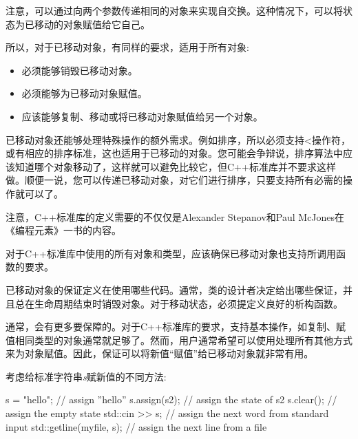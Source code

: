 
注意，可以通过向两个参数传递相同的对象来实现自交换。这种情况下，可以将状态为已移动的对象赋值给它自己。\par

所以，对于已移动对象，有同样的要求，适用于所有对象:\par

\begin{itemize}
  \item 必须能够销毁已移动对象。
  \item 必须能够为已移动对象赋值。
  \item 应该能够复制、移动或将已移动对象赋值给另一个对象。
\end{itemize}

已移动对象还能够处理特殊操作的额外需求。例如排序，所以必须支持<操作符，或有相应的排序标准，这也适用于已移动的对象。您可能会争辩说，排序算法中应该知道哪个对象移动了，这样就可以避免比较它，但C++标准库并不要求这样做。顺便一说，您可以传递已移动对象，对它们进行排序，只要支持所有必需的操作就可以了。\par

注意，C++标准库的定义需要的不仅仅是Alexander Stepanov和Paul McJones在《编程元素》一书的内容。\par

对于C++标准库中使用的所有对象和类型，应该确保已移动对象也支持所调用函数的要求。\par


已移动对象的保证定义在使用哪些代码。通常，类的设计者决定给出哪些保证，并且总在生命周期结束时销毁对象。对于移动状态，必须提定义良好的析构函数。\par

通常，会有更多要保障的。对于C++标准库的要求，支持基本操作，如复制、赋值相同类型的对象通常就足够了。然而，用户通常希望可以使用处理所有其他方式来为对象赋值。因此，保证可以将新值“赋值”给已移动对象就非常有用。\par

考虑给标准字符串\textit{s}赋新值的不同方法:\par

\begin{codebox}[cpp]
s = "hello"; // assign ”hello”
s.assign(s2); // assign the state of s2
s.clear(); // assign the empty state
std::cin >> s; // assign the next word from standard input
std::getline(myfile, s); // assign the next line from a file
\end{codebox}

